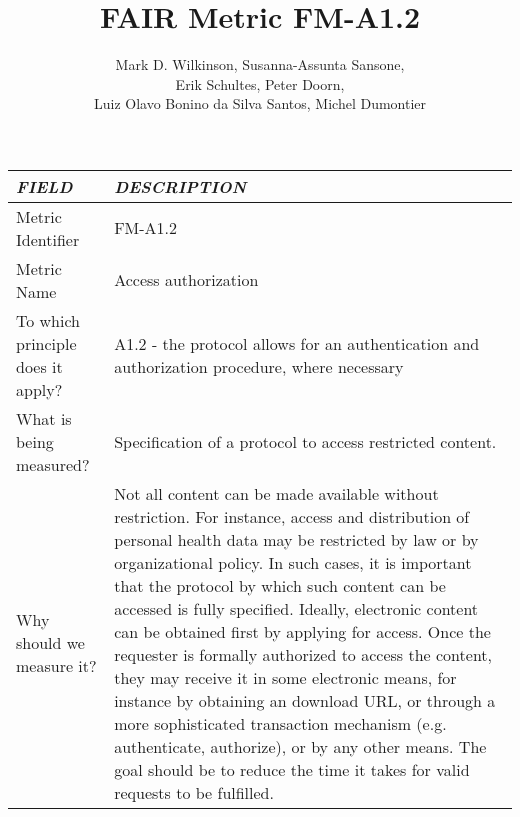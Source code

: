 \documentclass[english]{article}
\begin{document}
\title{FAIR Metric FM-A1.2}

\author{Mark D. Wilkinson, Susanna-Assunta Sansone, \\Erik Schultes, Peter Doorn,\\ 
Luiz Olavo Bonino da Silva Santos, Michel Dumontier}

\maketitle

\newpage





\begin{longtable}{|p{5cm}|p{9cm}|}


\hline
\emph{FIELD} & \emph{DESCRIPTION} \\
\hline
Metric Identifier &   FM-A1.2
 \\


\hline
Metric Name &   



Access authorization



 \\



\hline
To which principle does it apply? &   


A1.2 - the protocol allows for an authentication and authorization procedure, where necessary

\\



\hline
What is being measured? & 

Specification of a protocol to access restricted content.


\\



\hline
Why should we measure it? & 


Not all content can be made available without restriction. For instance, access and distribution of personal health data may be restricted by law or by organizational policy. In such cases, it is important that the protocol by which such content can be accessed is fully specified. Ideally, electronic content can be obtained first by applying for access. Once the requester is formally authorized to access the content, they may receive it in some electronic means, for instance by obtaining an download URL, or through a more sophisticated transaction mechanism (e.g. authenticate, authorize), or by any other means. The goal should be to reduce the time it takes for valid requests to be fulfilled. 
  

\end{longtable}
\end{document}
